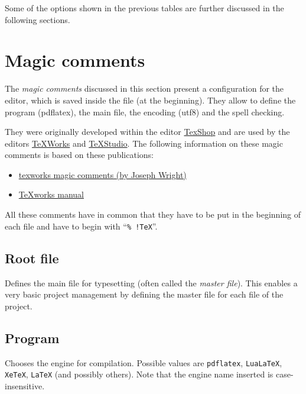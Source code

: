 
Some of the options shown in the previous tables are further discussed in the following sections.

\section{Magic comments}
\label{sec:doc:magiccomments}

The \emph{magic comments} discussed in this section present a configuration for the editor, which is saved inside the \latex file (at the beginning). They allow to define the program (pdflatex), the main file, the encoding (utf8) and the spell checking. 

They were originally developed within the editor \href{http://pages.uoregon.edu/koch/texshop/index.html}{TexShop} and are used by the editors \href{http://www.tug.org/texworks/}{TeXWorks} and \href{http://texstudio.sourceforge.net/}{TeXStudio}.
%
The following information on these magic comments is based on these publications:
%
\begin{itemize}
\item \href{http://www.texdev.net/2011/03/24/texworks-magic-comments/} %
      {texworks magic comments (by Joseph Wright)}
\item \href{http://ftp.ctex.org/pub/tex/tools/editors/TeXworks/manual.pdf}%
      {TeXworks manual}
\end{itemize}
%
All these comments have in common that they have to be put in the beginning of each file and have to begin with \enquote{\texttt{\% !TeX}}. 

\subsection{Root file}
\begin{latexcode}
\end{latexcode}
%
Defines the main file for typesetting (often called the \emph{master file}). This enables a very basic project management by defining the master file for each file of the project.

\subsection{Program}
\begin{latexcode}
\end{latexcode}
%
Chooses the engine for compilation. Possible values are \texttt{pdflatex}, \texttt{LuaLaTeX}, \texttt{XeTeX}, \texttt{LaTeX} (and possibly others). Note that the engine name inserted is case-insensitive.

